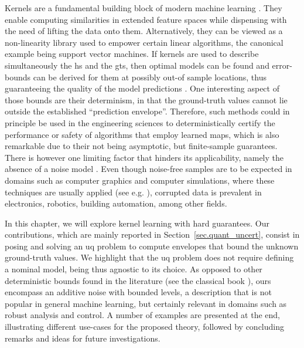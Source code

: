 Kernels are a fundamental building block of modern machine learning \citep{scholkopf2002learning}. They enable computing similarities in extended feature spaces while dispensing with the need of lifting the data onto them. Alternatively, they can be viewed as a non-linearity library used to empower certain linear algorithms, the canonical example being support vector machines. If kernels are used to describe simultaneously the \ac{hs} and the \ac{gts}, then optimal models can be found and error-bounds can be derived for them at possibly out-of sample locations, thus guaranteeing the quality of the model predictions \citep{schaback2006kernel,kanagawa2018gaussian}. One interesting aspect of those bounds are their determinism, in that the ground-truth values cannot lie outside the established ``prediction envelope''. Therefore, such methods could in principle be used in the engineering sciences to deterministically certify the performance or safety of algorithms that employ learned maps, which is also remarkable due to their not being asymptotic, but finite-sample guarantees. There is however one limiting factor that hinders its applicability, namely the absence of a noise model \citep[§11]{wendland2004scattered}. Even though noise-free samples are to be expected in domains such as computer graphics and  computer simulations, where these techniques are usually applied  (see e.g. \citep{sarra2005adaptive,nikan2022numerical}), corrupted data is prevalent in electronics, robotics, building automation, among other fields. 

In this chapter, we will explore kernel learning with hard guarantees. Our contributions, which are mainly reported in Section~\ref{sec.quant_uncert}, consist in posing and solving an \ac{uq} problem to compute envelopes that bound the unknown ground-truth values. We highlight that the \ac{uq} problem does not require defining a nominal model, being thus agnostic to its choice. As opposed to other deterministic bounds found in the literature (see the classical book \citep[§11]{wendland2004scattered}), ours encompass an additive noise with bounded levels, a description that is not popular in general machine learning, but certainly relevant in domains such as robust analysis and control. A number of examples are presented at the end, illustrating different use-cases for the proposed theory, followed by concluding remarks and ideas for future investigations.


